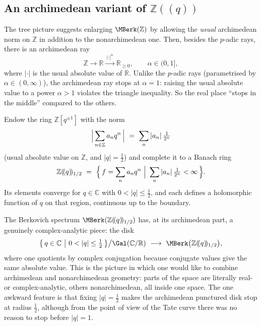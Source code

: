 \subsection{An archimedean variant of \texorpdfstring{$\mathbb{Z}(\!(q)\!)$}{Z((q))}}

The tree picture suggests enlarging $\MBerk(\mathbb{Z})$ by allowing the
\emph{usual} archimedean norm on $\mathbb{Z}$ in addition to the nonarchimedean
one. Then, besides the $p$-adic rays, there is an archimedean ray
\begin{equation*}
\mathbb{Z}\to\mathbb{R}\xrightarrow{\ |\cdot|^{\alpha}\ }\mathbb{R}_{\ge0},
\qquad \alpha\in(0,1],
\end{equation*}
where $|\cdot|$ is the usual absolute value of $\mathbb{R}$. Unlike the
$p$-adic rays (parametrised by $\alpha\in(0,\infty)$), the archimedean ray stops
at $\alpha=1$: raising the usual absolute value to a power $\alpha>1$ violates
the triangle inequality. So the real place ``stops in the middle'' compared to
the others.

\begin{definition}
\label{def:12:Zq-half}
Endow the ring $\mathbb{Z}[q^{\pm1}]$ with the norm
\begin{equation*}
\Bigl|\,\sum_{n\in\mathbb{Z}} a_n q^{n}\,\Bigr|\ =\ \sum_{n}|a_n|\,\tfrac{1}{2^{n}}
\end{equation*}
(usual absolute value on $\mathbb{Z}$, and $|q|=\tfrac12$) and complete it to a
Banach ring
\begin{equation*}
\mathbb{Z}(\!(q)\!)_{1/2}\ =\ \Bigl\{\,f=\sum_n a_n q^{n}\ \Big|\
\sum_n |a_n|\,\tfrac{1}{2^{n}}<\infty\,\Bigr\}.
\end{equation*}
Its elements converge for $q\in\mathbb{C}$ with $0<|q|\le\tfrac12$, and each
defines a holomorphic function of $q$ on that region, continuous up to the
boundary.
\end{definition}

The Berkovich spectrum $\MBerk(\mathbb{Z}(\!(q)\!)_{1/2})$ has, at its
archimedean part, a genuinely complex-analytic piece: the disk
\begin{equation*}
\bigl\{\,q\in\mathbb{C}\ \big|\ 0<|q|\le\tfrac12\,\bigr\}\big/\Gal(\mathbb{C}/\mathbb{R})
\ \longrightarrow\ \MBerk\bigl(\mathbb{Z}(\!(q)\!)_{1/2}\bigr),
\end{equation*}
where one quotients by complex conjugation because conjugate values give the
same absolute value. This is the picture in which one would like to combine
archimedean and nonarchimedean geometry: parts of the space are literally
real- or complex-analytic, others nonarchimedean, all inside one space. The one
awkward feature is that fixing $|q|=\tfrac12$ makes the archimedean punctured
disk stop at radius $\tfrac12$, although from the point of view of the Tate curve
there was no reason to stop before $|q|=1$.


